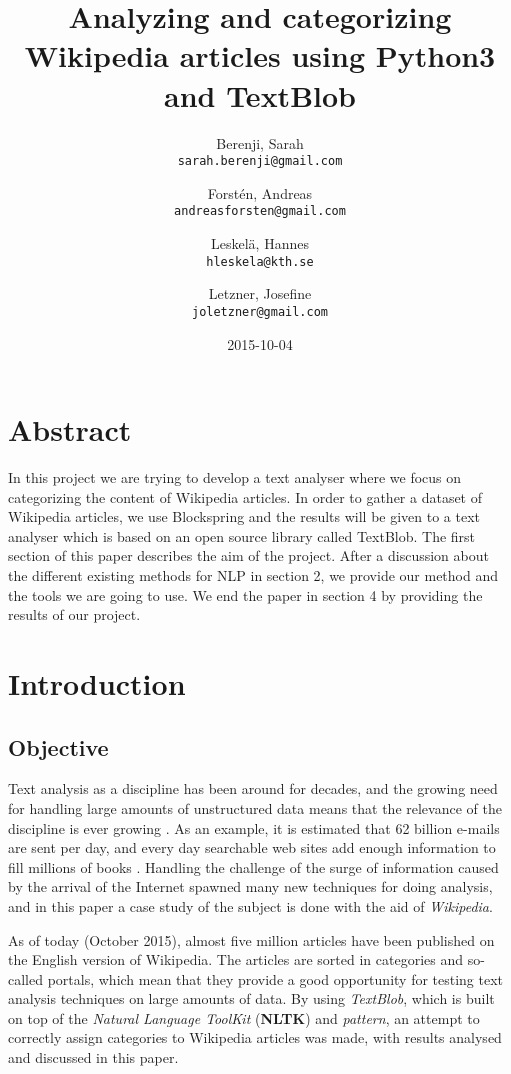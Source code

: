 \documentclass[a4paper]{article}
\title{Analyzing and categorizing Wikipedia articles using Python3 and TextBlob}
\author{
  Berenji, Sarah\\
  \texttt{sarah.berenji@gmail.com}
  \and
  Forstén, Andreas\\
  \texttt{andreasforsten@gmail.com}
  \and
  Leskelä, Hannes\\
  \texttt{hleskela@kth.se}
  \and
  Letzner, Josefine\\
    \texttt{joletzner@gmail.com}
}
\date{2015-10-04}
\begin{document}
\maketitle
\section*{Abstract}
In this project we are trying to develop a text analyser where we focus on categorizing the content of Wikipedia articles. In order to gather a dataset of Wikipedia articles, we use Blockspring and the results will be given to a text analyser which is based on an open source library called TextBlob. The first section of this paper describes the aim of the project. After a discussion about the different existing methods for NLP in section 2, we provide our method and the tools we are going to use. We end the paper in section 4 by providing the results of our project.


\newpage
\tableofcontents
\newpage

\section{Introduction}


\vspace{3mm}

\subsection{Objective}

Text analysis as a discipline has been around for decades, and the growing need for handling large amounts of unstructured data means that the relevance of the discipline is ever growing \cite{HistoryofTextAnalytics}. As an example, it is estimated that 62 billion e-mails are sent per day, and every day searchable web sites add enough information to fill millions of books \cite{ChallengesInTextAnalytics}. Handling the challenge of the surge of information caused by the arrival of the Internet spawned many new techniques for doing analysis, and in this paper a case study of the subject is done with the aid of \textit{Wikipedia}. 

\vspace{3mm}

As of today (October 2015), almost five million articles have been published on the English version of Wikipedia\cite{wikipedia}. The articles are sorted in categories and so-called portals, which mean that they provide a good opportunity for testing text analysis techniques on large amounts of data. By using \textit{TextBlob}, which is built on top of the \textit{Natural Language ToolKit} (\textbf{NLTK}) and \textit{pattern}\cite{textblob}, an attempt to correctly assign categories to Wikipedia articles was made, with results analysed and discussed in this paper. 
\end{document}
